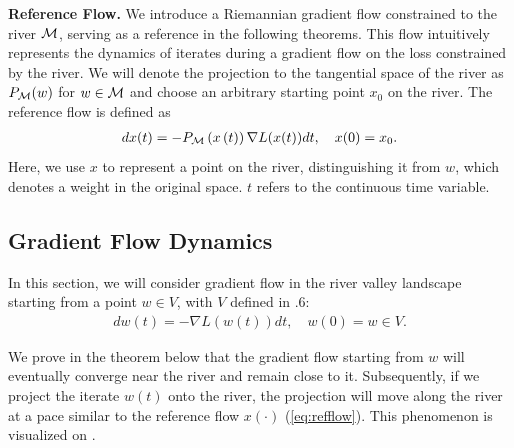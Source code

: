 \textbf{Reference Flow.} We introduce a Riemannian gradient flow constrained to the river $\mathcal{M}$, serving as a reference in the following theorems. This flow intuitively represents the dynamics of iterates during a gradient flow on the loss constrained by the river. We will denote the projection to the tangential space of the river as ${P}_{\mathcal{M}}(w)$ for $w \in \mathcal{M}$ and choose an arbitrary starting point $x_0$ on the river. The reference flow is defined as
\begin{align}
\label{eq:refflow}
    d x(t) = -{P}_{\mathcal{M}} \left(x\left(t\right)\right) \nabla L(x(t)) dt, \quad x(0) = x_0.  
\end{align}
Here, we use \( x \) to represent a point on the river, distinguishing it from \( w \), which denotes a weight in the original space. \( t \) refers to the continuous time variable. 


\subsection{Gradient Flow Dynamics}

In this section, we will consider gradient flow in the river valley landscape starting from a point $w \in V$, with $V$ defined in .6: 
\begin{align}
\label{eq:gfflow}
    d w(t) = - \nabla L(w(t)) dt, \quad w(0) = w \in V.  
\end{align}

We prove in the theorem below that the gradient flow starting from $w$ will eventually converge near the river and remain close to it. Subsequently, if we project the iterate $w(t)$ onto the river, the projection will move along the river at a pace similar to the reference flow $x(\cdot)$ (\cref{eq:refflow}). This phenomenon is visualized on .



